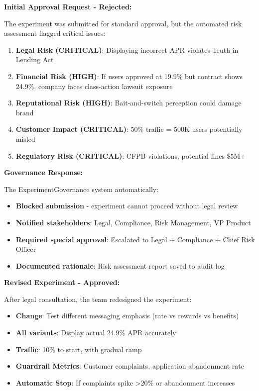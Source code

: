 \textbf{Initial Approval Request - Rejected:}

The experiment was submitted for standard approval, but the automated risk assessment flagged critical issues:

\begin{enumerate}
    \item \textbf{Legal Risk (CRITICAL)}: Displaying incorrect APR violates Truth in Lending Act
    \item \textbf{Financial Risk (HIGH)}: If users approved at 19.9\% but contract shows 24.9\%, company faces class-action lawsuit exposure
    \item \textbf{Reputational Risk (HIGH)}: Bait-and-switch perception could damage brand
    \item \textbf{Customer Impact (CRITICAL)}: 50\% traffic = 500K users potentially misled
    \item \textbf{Regulatory Risk (CRITICAL)}: CFPB violations, potential fines \$5M+
\end{enumerate}

\textbf{Governance Response:}

The ExperimentGovernance system automatically:
\begin{itemize}
    \item \textbf{Blocked submission} - experiment cannot proceed without legal review
    \item \textbf{Notified stakeholders}: Legal, Compliance, Risk Management, VP Product
    \item \textbf{Required special approval}: Escalated to Legal + Compliance + Chief Risk Officer
    \item \textbf{Documented rationale}: Risk assessment report saved to audit log
\end{itemize}

\textbf{Revised Experiment - Approved:}

After legal consultation, the team redesigned the experiment:

\begin{itemize}
    \item \textbf{Change}: Test different messaging emphasis (rate vs rewards vs benefits)
    \item \textbf{All variants}: Display actual 24.9\% APR accurately
    \item \textbf{Traffic}: 10\% to start, with gradual ramp
    \item \textbf{Guardrail Metrics}: Customer complaints, application abandonment rate
    \item \textbf{Automatic Stop}: If complaints spike >20\% or abandonment increases
\end{itemize}

